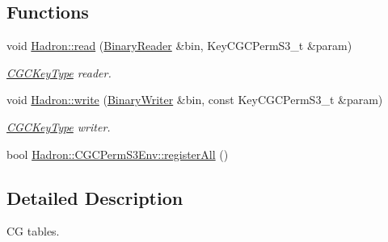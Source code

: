 \subsection*{Functions}
\begin{DoxyCompactItemize}
\item 
void \mbox{\hyperlink{namespaceHadron_ad884472dd0b4c3567f37f8320b63dee3}{Hadron\+::read}} (\mbox{\hyperlink{classADATIO_1_1BinaryReader}{Binary\+Reader}} \&bin, Key\+C\+G\+C\+Perm\+S3\+\_\+t \&param)
\begin{DoxyCompactList}\small\item\em \mbox{\hyperlink{structHadron_1_1CGCKeyType}{C\+G\+C\+Key\+Type}} reader. \end{DoxyCompactList}\item 
void \mbox{\hyperlink{namespaceHadron_a4073084eccc97c67b860f51e4efd91e0}{Hadron\+::write}} (\mbox{\hyperlink{classADATIO_1_1BinaryWriter}{Binary\+Writer}} \&bin, const Key\+C\+G\+C\+Perm\+S3\+\_\+t \&param)
\begin{DoxyCompactList}\small\item\em \mbox{\hyperlink{structHadron_1_1CGCKeyType}{C\+G\+C\+Key\+Type}} writer. \end{DoxyCompactList}\item 
bool \mbox{\hyperlink{namespaceHadron_1_1CGCPermS3Env_af27896ea7c15a1cdc0c664037d8f9a94}{Hadron\+::\+C\+G\+C\+Perm\+S3\+Env\+::register\+All}} ()
\end{DoxyCompactItemize}


\subsection{Detailed Description}
CG tables. 

